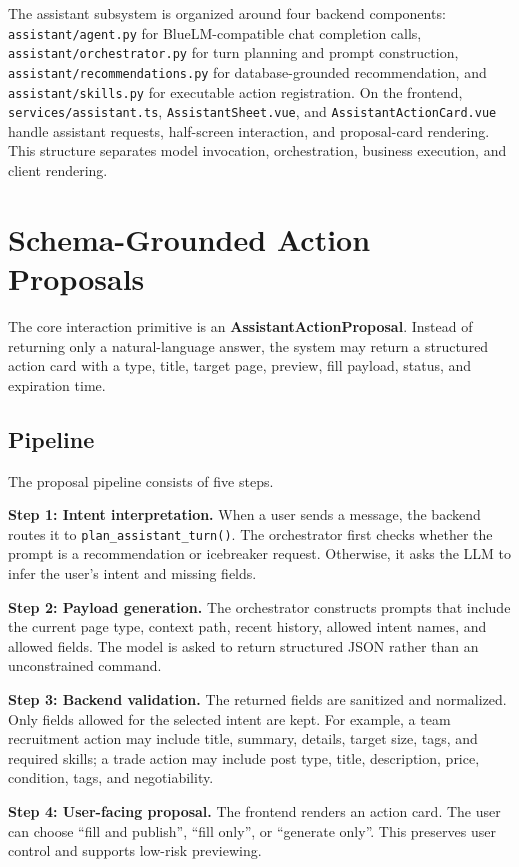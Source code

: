 \documentclass[twocolumn]{article}
\begin{document}
The assistant subsystem is organized around four backend components: \texttt{assistant/agent.py} for BlueLM-compatible chat completion calls, \texttt{assistant/orchestrator.py} for turn planning and prompt construction, \texttt{assistant/recommendations.py} for database-grounded recommendation, and \texttt{assistant/skills.py} for executable action registration. On the frontend, \texttt{services/assistant.ts}, \texttt{AssistantSheet.vue}, and \texttt{AssistantActionCard.vue} handle assistant requests, half-screen interaction, and proposal-card rendering. This structure separates model invocation, orchestration, business execution, and client rendering.

\section{Schema-Grounded Action Proposals}
The core interaction primitive is an \textbf{AssistantActionProposal}. Instead of returning only a natural-language answer, the system may return a structured action card with a type, title, target page, preview, fill payload, status, and expiration time.

\subsection{Pipeline}
The proposal pipeline consists of five steps.

\textbf{Step 1: Intent interpretation.} When a user sends a message, the backend routes it to \texttt{plan\_assistant\_turn()}. The orchestrator first checks whether the prompt is a recommendation or icebreaker request. Otherwise, it asks the LLM to infer the user's intent and missing fields.

\textbf{Step 2: Payload generation.} The orchestrator constructs prompts that include the current page type, context path, recent history, allowed intent names, and allowed fields. The model is asked to return structured JSON rather than an unconstrained command.

\textbf{Step 3: Backend validation.} The returned fields are sanitized and normalized. Only fields allowed for the selected intent are kept. For example, a team recruitment action may include title, summary, details, target size, tags, and required skills; a trade action may include post type, title, description, price, condition, tags, and negotiability.

\textbf{Step 4: User-facing proposal.} The frontend renders an action card. The user can choose ``fill and publish'', ``fill only'', or ``generate only''. This preserves user control and supports low-risk previewing.
\end{document}
